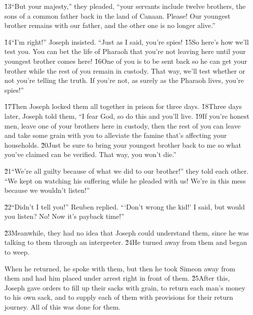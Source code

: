 \v{13}``But your majesty,'' they pleaded, ``your servants include twelve brothers, the sons of a common father back in the land of Canaan. Please! Our youngest brother remains with our father, and the other one is no longer alive.''

\v{14}``I'm right!'' Joseph insisted. ``Just as I said, you're spies! \v{15}So here's how we'll test you. You can bet the life of Pharaoh that you're not leaving here until your youngest brother comes here! \v{16}One of you is to be sent back so he can get your brother while the rest of you remain in custody. That way, we'll test whether or not you're telling the truth. If you're not, as surely as the Pharaoh lives, you're spies!''

\v{17}Then Joseph locked them all together in prison for three days. \v{18}Three days later, Joseph told them, ``I fear God, so do this and you'll live. \v{19}If you're honest men, leave one of your brothers here in custody, then the rest of you can leave and take some grain with you to alleviate the famine that's affecting your households. \v{20}Just be sure to bring your youngest brother back to me so what you've claimed can be verified. That way, you won't die.''

\v{21}``We're all guilty because of what we did to our brother!'' they told each other. ``We kept on watching his suffering while he pleaded with us! We're in this mess because we wouldn't listen!''

\v{22}``Didn't I tell you!'' Reuben replied. ```Don't wrong the kid!' I said, but would you listen? No! Now it's payback time!''

\v{23}Meanwhile, they had no idea that Joseph could understand them, since he was talking to them through an interpreter. \v{24}He turned away from them and began to weep.

When he returned, he spoke with them, but then he took Simeon away from them and had him placed under arrest right in front of them. \v{25}After this, Joseph gave orders to fill up their sacks with grain, to return each man's money to his own sack, and to supply each of them with provisions for their return journey. All of this was done for them.

